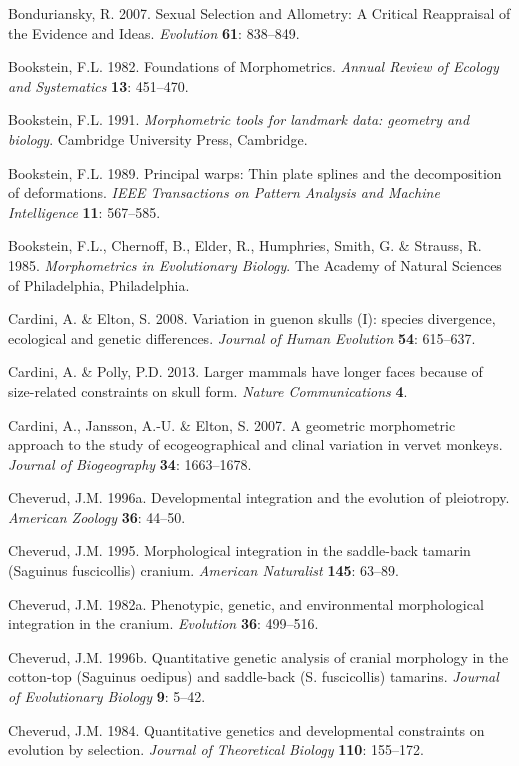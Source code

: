 \documentclass[12pt,twoside]{report}
\begin{document}
Bonduriansky, R. 2007. Sexual Selection and Allometry: A Critical
Reappraisal of the Evidence and Ideas. \emph{Evolution} \textbf{61}:
838--849.

Bookstein, F.L. 1982. Foundations of Morphometrics. \emph{Annual Review
of Ecology and Systematics} \textbf{13}: 451--470.

Bookstein, F.L. 1991. \emph{Morphometric tools for landmark data:
geometry and biology}. Cambridge University Press, Cambridge.

Bookstein, F.L. 1989. Principal warps: Thin plate splines and the
decomposition of deformations. \emph{IEEE Transactions on Pattern
Analysis and Machine Intelligence} \textbf{11}: 567--585.

Bookstein, F.L., Chernoff, B., Elder, R., Humphries, Smith, G. \&
Strauss, R. 1985. \emph{Morphometrics in Evolutionary Biology}. The
Academy of Natural Sciences of Philadelphia, Philadelphia.

Cardini, A. \& Elton, S. 2008. Variation in guenon skulls (I): species
divergence, ecological and genetic differences. \emph{Journal of Human
Evolution} \textbf{54}: 615--637.

Cardini, A. \& Polly, P.D. 2013. Larger mammals have longer faces
because of size-related constraints on skull form. \emph{Nature
Communications} \textbf{4}.

Cardini, A., Jansson, A.-U. \& Elton, S. 2007. A geometric morphometric
approach to the study of ecogeographical and clinal variation in vervet
monkeys. \emph{Journal of Biogeography} \textbf{34}: 1663--1678.

Cheverud, J.M. 1996a. Developmental integration and the evolution of
pleiotropy. \emph{American Zoology} \textbf{36}: 44--50.

Cheverud, J.M. 1995. Morphological integration in the saddle-back
tamarin (Saguinus fuscicollis) cranium. \emph{American Naturalist}
\textbf{145}: 63--89.

Cheverud, J.M. 1982a. Phenotypic, genetic, and environmental
morphological integration in the cranium. \emph{Evolution} \textbf{36}:
499--516.

Cheverud, J.M. 1996b. Quantitative genetic analysis of cranial
morphology in the cotton-top (Saguinus oedipus) and saddle-back (S.
fuscicollis) tamarins. \emph{Journal of Evolutionary Biology}
\textbf{9}: 5--42.

Cheverud, J.M. 1984. Quantitative genetics and developmental constraints
on evolution by selection. \emph{Journal of Theoretical Biology}
\textbf{110}: 155--172.
\end{document}
